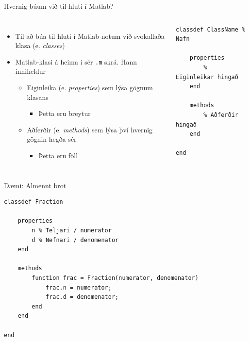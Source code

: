 \documentclass[handout]{beamer}
\begin{document}
\begin{frame}[fragile]{Hvernig búum við til hluti í Matlab?}
\begin{columns}
\begin{itemize}
 \item Til að búa til hluti í Matlab notum við svokallaða klasa (e. \emph{classes})
 \item Matlab-klasi á heima í sér \texttt{.m} skrá. Hann inniheldur
 \begin{itemize}
  \item Eiginleika (e. \emph{properties}) sem lýsa gögnum klasans
  \begin{itemize}
   \item Þetta eru breytur
  \end{itemize}
  \item Aðferðir (e. \emph{methods}) sem lýsa því hvernig gögnin hegða sér
  \begin{itemize}
   \item Þetta eru föll
  \end{itemize}
 \end{itemize}
\end{itemize}
\begin{verbatim}
classdef ClassName % Nafn

    properties
        % Eiginleikar hingað
    end
    
    methods
        % Aðferðir hingað
    end
    
end
\end{verbatim}

\end{columns}
\end{frame}

\begin{frame}[fragile]{Dæmi: Almennt brot}
\begin{verbatim}
classdef Fraction

    properties
        n % Teljari / numerator
        d % Nefnari / denomenator
    end
    
    methods
        function frac = Fraction(numerator, denomenator)
            frac.n = numerator;
            frac.d = denomenator;
        end
    end
    
end
\end{verbatim}

\end{frame}
\end{document}
